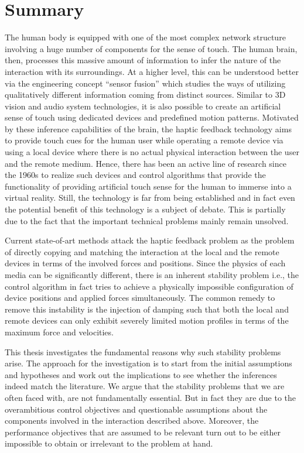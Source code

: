 \chapter{Summary}

The human body is equipped with one of the most complex network structure involving a huge number of components for the sense of touch. 
The human brain, then, processes this massive amount of information to infer the nature of the interaction with its surroundings. At a 
higher level, this can be understood better via the engineering concept \enquote{sensor fusion} which studies the ways of utilizing qualitatively 
different information coming from distinct sources. Similar to 3D vision and audio system technologies, it is also possible to create an 
artificial sense of touch using dedicated devices and predefined motion patterns. Motivated by these inference capabilities of the brain, 
the haptic feedback technology aims to provide touch cues for the human user while operating a remote device via using a local device 
where there is no actual physical interaction between the user and the remote medium. Hence, there has been an active line of research 
since the 1960s to realize such devices and control algorithms that provide the functionality of providing artificial touch sense for the 
human to immerse into a virtual reality. Still, the technology is far from being established and in fact even the potential benefit of 
this technology is a subject of debate. This is partially due to the fact that the important technical problems mainly remain unsolved. 

Current state-of-art methods attack the haptic feedback problem as the problem of directly copying and matching the interaction at the 
local and the remote devices in terms of the involved forces and positions. Since the physics of each media can be significantly 
different, there is an inherent stability problem i.e., the control algorithm in fact tries to achieve a physically impossible 
configuration of device positions and applied forces simultaneously. The common remedy to remove this instability is the injection of 
damping such that both the local and remote devices can only exhibit severely limited motion profiles in terms of the maximum force and 
velocities.

This thesis investigates the fundamental reasons why such stability problems arise. The approach for the investigation is to start from 
the initial assumptions and hypotheses and work out the implications to see whether the inferences indeed match the literature. We argue 
that the stability problems that we are often faced with, are not fundamentally essential. But in fact they are due to the overambitious 
control objectives and questionable assumptions about the components involved in the interaction described above. Moreover, the 
performance objectives that are assumed to be relevant turn out to be either impossible to obtain or irrelevant to the problem at hand. 

